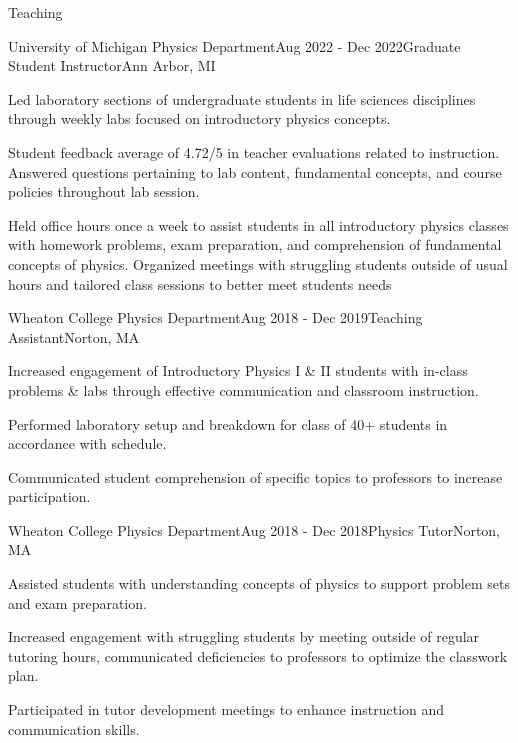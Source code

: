 \documentclass{resume} %
\begin{document}
\begin{rSection}{Teaching}

    

\begin{rSubsection}{University of Michigan Physics Department}{Aug 2022 - Dec 2022}{Graduate Student Instructor}{Ann Arbor, MI}
\item Led laboratory sections of undergraduate students in life sciences disciplines through weekly labs focused on introductory physics concepts. 
\item Student feedback average of 4.72/5 in teacher evaluations related to instruction. Answered questions pertaining to lab content, fundamental concepts, and course policies throughout lab session.
\item Held office hours once a week to assist students in all introductory physics classes with homework problems, exam preparation, and comprehension of fundamental concepts of physics. Organized meetings with struggling students outside of usual hours and tailored class sessions to better meet students needs

\end{rSubsection}

\begin{rSubsection}{Wheaton College Physics Department}{Aug 2018 - Dec 2019}{Teaching Assistant}{Norton, MA}
\item Increased engagement of Introductory Physics I \& II students with in-class problems \& labs through effective communication and classroom instruction.
\item Performed laboratory setup and breakdown for class of 40+ students in accordance with schedule.
\item Communicated student comprehension of specific topics to professors to increase participation.

\end{rSubsection}

\begin{rSubsection}{Wheaton College Physics Department}{Aug 2018 - Dec 2018}{Physics Tutor}{Norton, MA}
\item Assisted students with understanding concepts of physics to support problem sets and exam preparation.
\item Increased engagement with struggling students by meeting outside of regular tutoring hours, communicated deficiencies to professors to optimize the classwork plan.
\item Participated in tutor development meetings to enhance instruction and communication skills.

\end{rSubsection}

\end{rSection}
\end{document}
